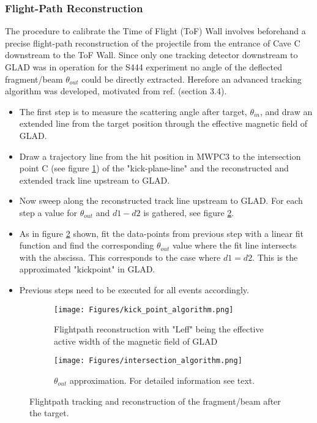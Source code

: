 \subsubsection{Flight-Path Reconstruction}\label{subsec:flightpath_reco}
The procedure to calibrate the Time of Flight (ToF) Wall involves beforehand a precise flight-path reconstruction of the projectile from the entrance of Cave C downstream to the ToF Wall. Since only one tracking detector downstream to GLAD was in operation for the S444 experiment no angle of the deflected fragment/beam $\theta_{out}$ could be directly extracted. Herefore an advanced tracking algorithm was developed, motivated from ref. \cite{bertini2013study} (section 3.4). 
\begin{itemize}
\item The first step is to measure the scattering angle after target, $\theta_{in}$, and draw an extended line from the target position through the effective magnetic field of GLAD.  
\item Draw a trajectory line from the hit position in MWPC3 to the intersection point C (see figure \ref{fig:sub1_reco_path}) of the "kick-plane-line" and the reconstructed and extended track line upstream to GLAD.
\item Now sweep along the reconstructed track line upstream to GLAD. For each step a value for $\theta_{out}$ and $d1-d2$ is gathered, see figure \ref{fig:sub2_reco_path}.
\item As in figure \ref{fig:sub2_reco_path} shown, fit the data-points from previous step with a linear fit function and find the corresponding $\theta_{out}$ value where the fit line intersects with the abscissa. This corresponds to the case where $d1 = d2$. This is the approximated "kickpoint" in GLAD. 
\item Previous steps need to be executed for all events accordingly.
\end{itemize}
\begin{figure}[ht]
    \centering
    \begin{subfigure}[b]{0.70\textwidth}
		\centering
        \texttt{[image: Figures/kick\_point\_algorithm.png]}
        \caption{Flightpath reconstruction with "Leff" being the effective active width of the magnetic field of GLAD}
        \label{fig:sub1_reco_path}
    \end{subfigure}
    \begin{subfigure}[b]{0.25\textwidth}
		\centering
        \texttt{[image: Figures/intersection\_algorithm.png]}
        \caption{$\theta_{out}$ approximation. For detailed information see text.}
        \label{fig:sub2_reco_path}
    \end{subfigure}

    \caption{Flightpath tracking and reconstruction of the fragment/beam after the target.}
    \label{fig:reco_path}
\end{figure}

